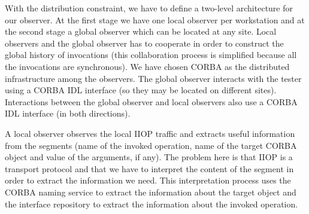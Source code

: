 With the distribution constraint, we have to define a two-level
architecture for our observer. At the first stage we have one local
observer per workstation and at the second stage a global observer
which can be located at any site. Local observers and the global
observer has to cooperate in order to construct the global history of
invocations (this collaboration process is simplified because all the
invocations are synchronous). We have chosen CORBA as the distributed
infrastructure among the observers. The global observer interacts with
the tester using a CORBA IDL interface (so they may be located on
different sites). Interactions between the global observer and local
observers also use a CORBA IDL interface (in both directions). 


A local observer observes the local IIOP traffic and extracts useful
information from the segments
(name of the invoked operation, name of the target CORBA object
and value of the arguments, if any). The problem here is that IIOP
is a transport protocol and that we have to interpret the content of
the segment in order to extract the information we need. This
interpretation process uses the CORBA naming service to extract the
information about the target object and the interface repository to
extract the information about the invoked operation.\\





